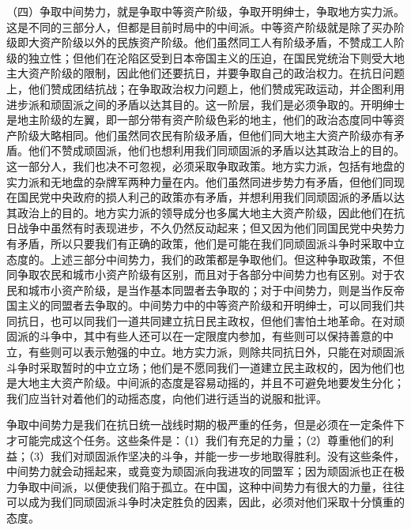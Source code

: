 （四）争取中间势力，就是争取中等资产阶级，争取开明绅士，争取地方实力派。这是不同的三部分人，但都是目前时局中的中间派。中等资产阶级就是除了买办阶级即大资产阶级以外的民族资产阶级。他们虽然同工人有阶级矛盾，不赞成工人阶级的独立性；但他们在沦陷区受到日本帝国主义的压迫，在国民党统治下则受大地主大资产阶级的限制，因此他们还要抗日，并要争取自己的政治权力。在抗日问题上，他们赞成团结抗战；在争取政治权力问题上，他们赞成宪政运动，并企图利用进步派和顽固派之间的矛盾以达其目的。这一阶层，我们是必须争取的。开明绅士是地主阶级的左翼，即一部分带有资产阶级色彩的地主，他们的政治态度同中等资产阶级大略相同。他们虽然同农民有阶级矛盾，但他们同大地主大资产阶级亦有矛盾。他们不赞成顽固派，他们也想利用我们同顽固派的矛盾以达其政治上的目的。这一部分人，我们也决不可忽视，必须采取争取政策。地方实力派，包括有地盘的实力派和无地盘的杂牌军两种力量在内。他们虽然同进步势力有矛盾，但他们同现在国民党中央政府的损人利己的政策亦有矛盾，并想利用我们同顽固派的矛盾以达其政治上的目的。地方实力派的领导成分也多属大地主大资产阶级，因此他们在抗日战争中虽然有时表现进步，不久仍然反动起来；但又因为他们同国民党中央势力有矛盾，所以只要我们有正确的政策，他们是可能在我们同顽固派斗争时采取中立态度的。上述三部分中间势力，我们的政策都是争取他们。但这种争取政策，不但同争取农民和城市小资产阶级有区别，而且对于各部分中间势力也有区别。对于农民和城市小资产阶级，是当作基本同盟者去争取的；对于中间势力，则是当作反帝国主义的同盟者去争取的。中间势力中的中等资产阶级和开明绅士，可以同我们共同抗日，也可以同我们一道共同建立抗日民主政权，但他们害怕土地革命。在对顽固派的斗争中，其中有些人还可以在一定限度内参加，有些则可以保持善意的中立，有些则可以表示勉强的中立。地方实力派，则除共同抗日外，只能在对顽固派斗争时采取暂时的中立立场；他们是不愿同我们一道建立民主政权的，因为他们也是大地主大资产阶级。中间派的态度是容易动摇的，并且不可避免地要发生分化；我们应当针对着他们的动摇态度，向他们进行适当的说服和批评。

争取中间势力是我们在抗日统一战线时期的极严重的任务，但是必须在一定条件下才可能完成这个任务。这些条件是：（1）我们有充足的力量；（2）尊重他们的利益；（3）我们对顽固派作坚决的斗争，并能一步一步地取得胜利。没有这些条件，中间势力就会动摇起来，或竟变为顽固派向我进攻的同盟军；因为顽固派也正在极力争取中间派，以便使我们陷于孤立。在中国，这种中间势力有很大的力量，往往可以成为我们同顽固派斗争时决定胜负的因素，因此，必须对他们采取十分慎重的态度。

